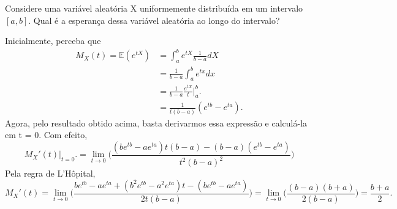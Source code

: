 \documentclass[./probability_notes.tex]{subfiles}
\begin{document}
\begin{example}
  Considere uma variável aleatória X uniformemente distribuída em um intervalo \([a, b]\). Qual é a esperança dessa variável aleatória ao longo do intervalo?

  Inicialmente, perceba que 
  \begin{align*}
    M_{X}(t) = \mathbb{E}(e^{tX}) &= \int_{a}^{b}e^{tX}\frac{1}{b-a}dX\\
                                  &= \frac{1}{b-a}\int_{a}^{b}e^{tx}dx\\
                                  &= \frac{1}{b-a}\frac{e^{tX}}{t}\biggl|_{a}^{b}\biggr.\\
                                  &= \frac{1}{t(b-a)}(e^{tb}-e^{ta}).
  \end{align*}
  Agora, pelo resultado obtido acima, basta derivarmos essa expressão e calculá-la em t = 0. Com efeito, 
  \[
    M_{X}'(t)\biggl|_{t=0}^{}\biggr. = \lim_{t\to 0}\biggl(\frac{(b e^{tb}-a e^{ta})t(b-a) - (b-a)(e^{tb}-e^{ta})}{t^{2}(b-a)^{2}}\biggr)  
  \]
  Pela regra de L'Hôpital,
  \[
    M_{X}'(t) = \lim_{t\to 0}\biggl(\frac{be^{tb} - ae^{ta} + (b^{2}e^{tb} - a ^{2}e^{ta})t - (be^{tb}-ae^{ta})}{2t(b-a)}\biggr) = \lim_{t\to 0}\biggl(\frac{(b-a)(b+a)}{2(b-a)}\biggr) = \frac{b+a}{2}.
  \]
\end{example}
\end{document}
